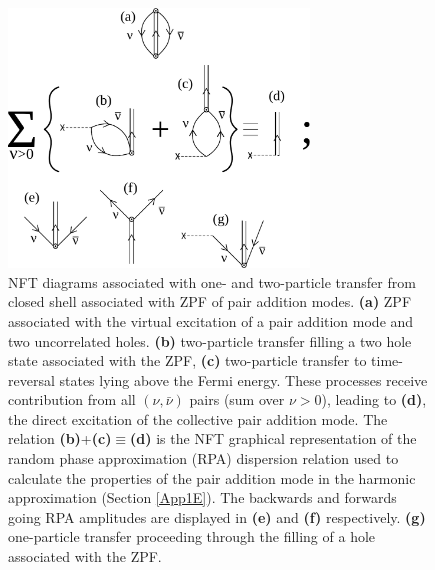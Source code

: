 \begin{figure}[h!]
\centerline {
\includegraphics*[width=8cm]{nutshell/figs/fig2_1_5}
}
\caption[NFT diagrams associated with one- and two-particle transfer from closed shell associated with ZPF of pair addition modes.]{NFT diagrams associated with one- and two-particle transfer from closed shell associated with ZPF of pair addition modes. \textbf{(a)} ZPF associated with the virtual excitation of a pair addition mode and two uncorrelated holes. \textbf{(b)} two-particle transfer filling a two hole state associated with the ZPF, \textbf{(c)} two-particle transfer to time-reversal states lying above the Fermi energy. These processes receive contribution from all $(\nu,\bar\nu)$ pairs (sum over $\nu>0$), leading to \textbf{(d)}, the direct excitation of the collective pair addition mode. The relation \textbf{(b)}+\textbf{(c)}$\equiv$\textbf{(d)} is the NFT graphical representation of the random phase approximation (RPA) dispersion relation used to calculate the properties of the pair addition mode in the harmonic approximation (Section \ref{App1E}). The backwards and forwards going RPA amplitudes are displayed in  \textbf{(e)} and \textbf{(f)} respectively. \textbf{(g)} one-particle transfer proceeding through the filling of a hole associated with the ZPF.}
\label{fig2.1.5}
\end{figure}

